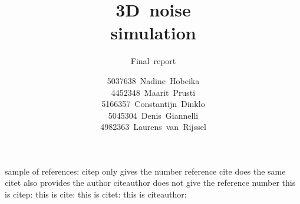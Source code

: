 \documentclass{tudelft-report}
\begin{document}
\frontmatter


\title[tudelft-white]{3D\ noise\\simulation}
\subtitle[tudelft-black]{\Huge Final\ report}
\author[tudelft-white]{\LARGE
5037638\ Nadine\ Hobeika \\
4452348\ Maarit\ Prusti \\
5166357\ Constantijn\ Dinklo\\
5045304\ Denis\ Giannelli\\
4982363\ Laurens\ van\ Rijssel}
\bigskip
{}
\makecover[split]






\tableofcontents

\mainmatter

sample of references:
citep only gives the number reference
cite does the same
citet also provides the author
citeauthor does not give the reference number
this is citep: \citep{3Dnoise}
this is cite: \cite{3Dnoise}
this is citet: \citet{3Dnoise}
this is citeauthor: \citeauthor{3Dnoise}


% 


\appendix

%


\end{document}
